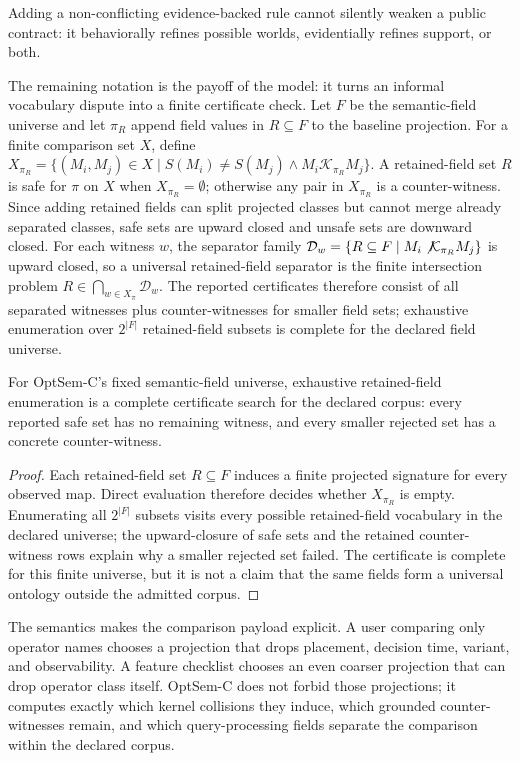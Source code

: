 \begin{observation}
Adding a non-conflicting evidence-backed rule cannot silently weaken a public contract: it behaviorally refines possible worlds, evidentially refines support, or both.
\end{observation}

The remaining notation is the payoff of the model: it turns an informal vocabulary dispute into a finite certificate check.  Let $F$ be the semantic-field universe and let $\pi_R$ append field values in $R\subseteq F$ to the baseline projection.  For a finite comparison set $X$, define $X_{\pi_R}=\{(M_i,M_j)\in X\mid S(M_i)\ne S(M_j)\land M_i\mathcal{K}_{\pi_R}M_j\}$.  A retained-field set $R$ is safe for $\pi$ on $X$ when $X_{\pi_R}=\emptyset$; otherwise any pair in $X_{\pi_R}$ is a counter-witness.  Since adding retained fields can split projected classes but cannot merge already separated classes, safe sets are upward closed and unsafe sets are downward closed.  For each witness $w$, the separator family $\mathcal{D}_w=\{R\subseteq F\mid M_i\not\mathcal{K}_{\pi_R}M_j\}$ is upward closed, so a universal retained-field separator is the finite intersection problem $R\in\bigcap_{w\in X_\pi}\mathcal{D}_w$.  The reported certificates therefore consist of all separated witnesses plus counter-witnesses for smaller field sets; exhaustive enumeration over $2^{|F|}$ retained-field subsets is complete for the declared field universe.

\begin{observation}
\label{thm:min-separator-complexity}
For OptSem-C's fixed semantic-field universe, exhaustive retained-field enumeration is a complete certificate search for the declared corpus: every reported safe set has no remaining witness, and every smaller rejected set has a concrete counter-witness.
\end{observation}
\begin{proof}
Each retained-field set $R\subseteq F$ induces a finite projected signature for every observed map.  Direct evaluation therefore decides whether $X_{\pi_R}$ is empty.  Enumerating all $2^{|F|}$ subsets visits every possible retained-field vocabulary in the declared universe; the upward-closure of safe sets and the retained counter-witness rows explain why a smaller rejected set failed.  The certificate is complete for this finite universe, but it is not a claim that the same fields form a universal ontology outside the admitted corpus.
\end{proof}

The semantics makes the comparison payload explicit.  A user comparing only operator names chooses a projection that drops placement, decision time, variant, and observability.  A feature checklist chooses an even coarser projection that can drop operator class itself.  OptSem-C does not forbid those projections; it computes exactly which kernel collisions they induce, which grounded counter-witnesses remain, and which query-processing fields separate the comparison within the declared corpus.
